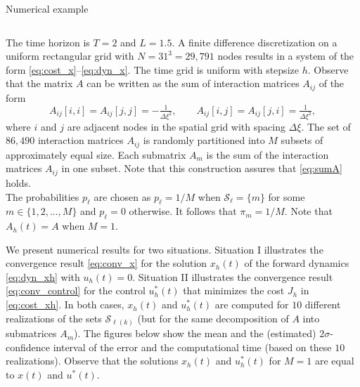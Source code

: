 \documentclass[mathserif]{beamer}
\begin{document}
\begin{frame}
\begin{columns}[T]
\begin{column}{.45\textwidth}
\begin{block}{Numerical example}
\begin{columns}
	\end{columns}
	
	\vspace{0.1cm}
The time horizon is $T = 2$ and $L = 1.5$. A finite difference discretization on a uniform rectangular grid with $N = 31^3 = 29,791$ nodes results in a system of the form \eqref{eq:cost_x}--\eqref{eq:dyn_x}. The time grid is uniform with stepsize $h$. 
	Observe that the matrix $A$ can be written as the sum of interaction matrices $A_{ij}$ of the form
      \begin{equation}
      A_{ij}[i,i] = A_{ij}[j,j] = -\tfrac{1}{\Delta \xi^2}, \qquad A_{ij}[i,j] = A_{ij}[j,i] = \tfrac{1}{\Delta \xi^2},
      \end{equation}
      where $i$ and $j$ are adjacent nodes in the spatial grid with spacing $\Delta \xi$. The set of $86,490$ interaction matrices $A_{ij}$ is randomly partitioned into $M$ subsets of approximately equal size. Each submatrix $A_m$ is the sum of the interaction matrices $A_{ij}$ in one subset. Note that this construction assures that \eqref{eq:sumA} holds.  \\
      The probabilities $p_\ell$ are chosen as $p_\ell = 1/M$ when $\mathcal{S}_\ell = \{ m \}$ for some $m \in \{1,2, \ldots , M \}$ and $p_\ell = 0$ otherwise. It follows that $\pi_m = 1/M$. Note that $A_h(t) = A$ when $M = 1$. 
      
      \bigskip
	  We present numerical results for two situations. Situation I illustrates the convergence result \eqref{eq:conv_x} for the solution $x_h(t)$ of the forward dynamics \eqref{eq:dyn_xh} with $u_h(t) = 0$. Situation II illustrates the convergence result \eqref{eq:conv_control} for the control $u_h^*(t)$ that minimizes the cost $J_h$ in \eqref{eq:cost_xh}. In both cases, $x_h(t)$ and $u^*_h(t)$ are computed for $10$ different realizations of the sets $\mathcal{S}_{\ell(k)}$ (but for the same decomposition of $A$ into submatrices $A_m$). The figures below show the mean and the (estimated) $2\sigma$-confidence interval of the error and the computational time (based on these $10$ realizations). Observe that the solutions $x_h(t)$ and $u_h^*(t)$ for $M = 1$ are equal to $x(t)$ and $u^*(t)$. 


\end{block}
\end{column}
\end{columns}
\end{frame}
\end{document}
